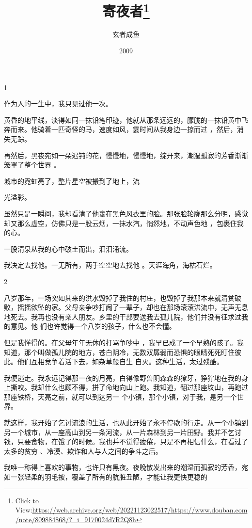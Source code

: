 \documentclass{article}
\title{寄夜者\footnote{Click to View:\url{https://web.archive.org/web/20221123022517/https://www.douban.com/note/809884868/?_i=9170024d7R2Q8h}}}
\author{玄者成鱼}
\date{2009}
\begin{document}

\maketitle


\Large


﻿1 


作为人的一生中，我只见过他一次。 

黄昏的地平线，淡得如同一抹铅笔印迹，他就从那条远远的，朦胧的一抹铅黄中飞奔而来。他骑着一匹奇怪的马，速度如风，霎时间从我身边一掠而过
，然后，消失无踪。 

再然后，黑夜宛如一朵迟钝的花，慢慢地，慢慢地，绽开来，潮湿孤寂的芳香渐渐笼罩了整个世界
。 

城市的霓虹亮了，整片星空被搬到了地上，流

\newpage
光溢彩。 

虽然只是一瞬间，我却看清了他裹在黑色风衣里的脸。那张脸轮廓那么分明，感觉却又那么虚空，仿佛只是一股云烟，一抹水汽，悄然地，不动声色地
，包裹住我的心。 


一股清泉从我的心中破土而出，汩汩涌流。 

我决定去找他。一无所有，两手空空地去找他
。天涯海角，海枯石烂。 


2 

八岁那年，一场突如其来的洪水毁掉了我住的村庄，也毁掉了我那本来就清贫破败，摇摇欲坠的家。父母亲争吵打闹了一辈子，却也在那场滚滚洪流中，无声无息地死去。我再也没有亲人朋友。乡里的干部要送我去孤儿院，他们并没有征求过我的意见。他
们也许觉得一个八岁的孩子，什么也不会懂。 

但是我懂得的。在父母年年无休的打骂争吵中
\newpage
，我早已成了一个早熟的孩子。我知道，那个叫做孤儿院的地方，苍白阴冷，无数双孱弱而恐惧的眼睛死死盯住彼此。他们互相竞争着活下去，如杂草般自生
自灭。这种生活，太过残酷。 

我便逃走。我永远记得那一夜的月亮，白得像野兽阴森森的獠牙，狰狞地在我的身上撕咬。我却什么也顾不得，拼了命地向山上跑。我知道，翻过那座坟山，再跑过那座铁桥，天亮之前，就可以到达另一
个小镇，那个小镇，对于我，是另一个世界。 

就这样，我开始了乞讨流浪的生活，也从此开始了永不停歇的行走。从一个小镇到另一个城市，从一座高山到另一条河流，从一片森林到另一片田野。我并不乞讨钱，只要食物，在饿了的时候。我也并不觉得疲倦，只是不再相信什么，在看过了太多的贫穷
、冷漠、欺诈和人与人之间的争斗之后。 

我唯一称得上喜欢的事物，也许只有黑夜。夜晚散发出来的潮湿而孤寂的芳香，宛如一张轻柔的羽毛被，覆盖了所有的肮脏丑陋，才能让我更快更稳的
\newpage
\end{document}

